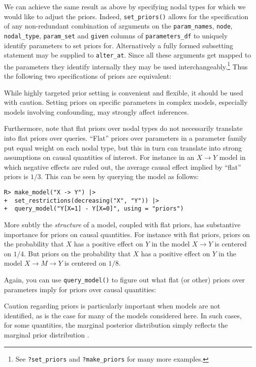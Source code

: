 \documentclass[
  11pt,
  article]{jss}
\begin{document}
We can achieve the same result as above by specifying nodal types for
which we would like to adjust the priors. Indeed, \texttt{set\_priors()}
allows for the specification of any non-redundant combination of
arguments on the \texttt{param\_names}, \texttt{node},
\texttt{nodal\_type}, \texttt{param\_set} and \texttt{given} columns of
\texttt{parameters\_df} to uniquely identify parameters to set priors
for. Alternatively a fully formed subsetting statement may be supplied
to \texttt{alter\_at}. Since all these arguments get mapped to the
parameters they identify internally they may be used
interchangeably.\footnote{See \texttt{?set\_priors} and
  \texttt{?make\_priors} for many more examples.} Thus the following two
specifications of priors are equivalent:

While highly targeted prior setting is convenient and flexible, it
should be used with caution. Setting priors on specific parameters in
complex models, especially models involving confounding, may strongly
affect inferences.

Furthermore, note that flat priors over nodal types do not necessarily
translate into flat priors over queries. ``Flat'' priors over parameters
in a parameter family put equal weight on each nodal type, but this in
turn can translate into strong assumptions on causal quantities of
interest. For instance in an \(X \rightarrow Y\) model in which negative
effects are ruled out, the average causal effect implied by ``flat''
priors is \(1/3\). This can be seen by querying the model as follows:

\begin{verbatim}
R> make_model("X -> Y") |>
+  set_restrictions(decreasing("X", "Y")) |>
+  query_model("Y[X=1] - Y[X=0]", using = "priors")
\end{verbatim}

More subtly the \emph{structure} of a model, coupled with flat priors,
has substantive importance for priors on causal quantities. For instance
with flat priors, priors on the probability that \(X\) has a positive
effect on \(Y\) in the model \(X \rightarrow Y\) is centered on \(1/4\).
But priors on the probability that \(X\) has a positive effect on \(Y\)
in the model \(X \rightarrow M \rightarrow Y\) is centered on \(1/8\).

Again, you can use \texttt{query\_model()} to figure out what flat (or
other) priors over parameters imply for priors over causal quantities:

Caution regarding priors is particularly important when models are not
identified, as is the case for many of the models considered here. In
such cases, for some quantities, the marginal posterior distribution
simply reflects the marginal prior distribution
\citep{poirier_revising_1998}.
\end{document}
